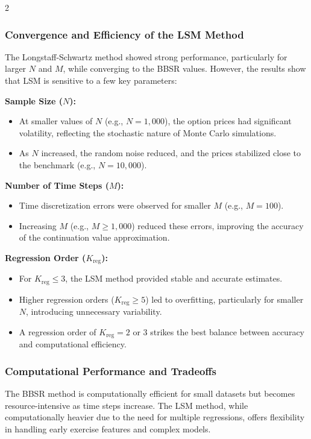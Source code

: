\begin{multicols}{2}
\subsubsection{Convergence and Efficiency of the LSM Method}
The Longstaff-Schwartz method showed strong performance, particularly for larger \(N\) and \(M\), while converging to the BBSR values. However, the results show that LSM is sensitive to a few key parameters:

\textbf{Sample Size (\(N\)):}  
\begin{itemize}
    \item At smaller values of \(N\) (e.g., \(N = 1,000\)), the option prices had significant volatility, reflecting the stochastic nature of Monte Carlo simulations.
    \item As \(N\) increased, the random noise reduced, and the prices stabilized close to the benchmark (e.g., \(N = 10,000\)).
\end{itemize}

\textbf{Number of Time Steps (\(M\)):}  
\begin{itemize}
    \item Time discretization errors were observed for smaller \(M\) (e.g., \(M = 100\)).
    \item Increasing \(M\) (e.g., \(M \geq 1,000\)) reduced these errors, improving the accuracy of the continuation value approximation.
\end{itemize}

\textbf{Regression Order (\(K_{\text{reg}}\)):}  
\begin{itemize}
    \item For \(K_{\text{reg}} \leq 3\), the LSM method provided stable and accurate estimates.
    \item Higher regression orders (\(K_{\text{reg}} \geq 5\)) led to overfitting, particularly for smaller \(N\), introducing unnecessary variability.
    \item A regression order of \(K_{\text{reg}} = 2\) or \(3\) strikes the best balance between accuracy and computational efficiency.
\end{itemize}

\subsubsection{Computational Performance and Tradeoffs}
The BBSR method is computationally efficient for small datasets but becomes resource-intensive as time steps increase. The LSM method, while computationally heavier due to the need for multiple regressions, offers flexibility in handling early exercise features and complex models.


\end{multicols}
